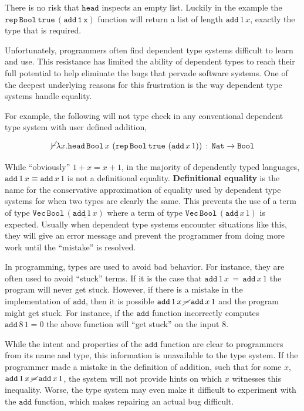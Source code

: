 There is no risk that $\mathtt{head}$ inspects an empty list.
Luckily in the example the $\mathtt{\mathtt{rep}\,\mathtt{Bool}\,\mathtt{true}\,\left(\mathtt{add}\,1\,x\right)}$ function will return a list of length $\mathtt{add}\,1\,x$, exactly the type that is required.


Unfortunately, programmers often find dependent type systems difficult to learn and use.
This resistance has limited the ability of dependent types to reach their full potential to help eliminate the bugs that pervade software systems.
One of the deepest underlying reasons for this frustration is the way dependent type systems handle equality.

For example, the following will not type check in any conventional dependent type system with user defined addition,

\[
\cancel{\vdash}\lambda x.\mathtt{head}\,\mathtt{Bool}\,x\,\left(\mathtt{rep}\,\mathtt{Bool}\,\mathtt{true}\,\left(\mathtt{add}\,x\,1\right)\right)\,:\,\mathtt{Nat}{} \rightarrow\mathtt{Bool}
\]

While ``obviously'' $1+x=x+1$, in the majority of dependently typed languages, $\mathtt{add}\,1\,x\equiv\mathtt{add}\,x\,1$ is not a definitional equality.
\textbf{Definitional equality} is the name for the conservative approximation of equality used by dependent type systems for when two types are clearly the same.
This prevents the use of a term of type
$\mathtt{Vec}\,\mathtt{Bool}\,\left(\underline{\mathtt{add}\,1\,x}\right)$
where a term of type
$\mathtt{Vec}\,\mathtt{Bool}\,\left(\underline{\mathtt{add}\,x\,1}\right)$
is expected.
Usually when dependent type systems encounter situations like this, they will give an error message and prevent the programmer from doing more work until the ``mistake'' is resolved.

In programming, types are used to avoid bad behavior.
For instance, they are often used to avoid ``stuck'' terms.
If it is the case that $\mathtt{add}\,1\,x\,=\,\mathtt{add}\,x\,1$ the program will never get stuck.
However, if there is a mistake in the implementation of $\mathtt{add}$, then it is possible $\mathtt{add}\,1\,x\,\cancel{=}\,\mathtt{add}\,x\,1$ and the program might get stuck.
For instance, if the $\mathtt{add}$ function incorrectly computes $\mathtt{add}\,8\,1=0$ the above function will ``get stuck'' on the input $8$.

While the intent and properties of the $\mathtt{add}$ function are clear to programmers from its name and type, this information is unavailable to the type system.
If the programmer made a mistake in the definition of addition, such that for some $x$, $\mathtt{add}\,1\,x\,\cancel{=}\,\mathtt{add}\,x\,1$, the system will not provide hints on which $x$ witnesses this inequality.
Worse, the type system may even make it difficult to experiment with the $\mathtt{add}$ function, which makes repairing an actual bug difficult.

